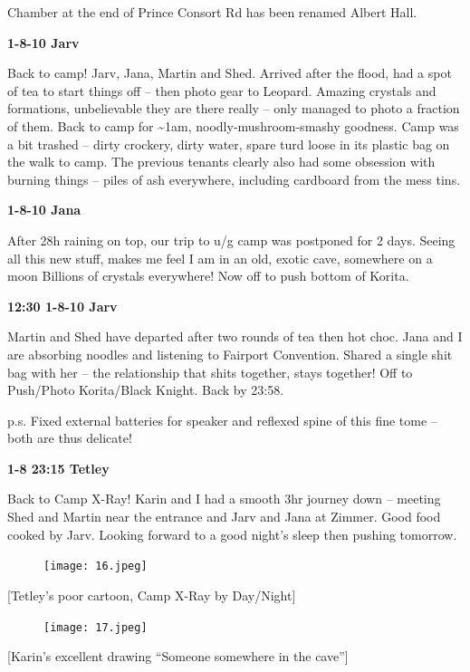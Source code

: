 Chamber at the end of Prince Consort Rd has been renamed Albert Hall.

\textbf{1-8-10 Jarv}

Back to camp! Jarv, Jana, Martin and Shed. Arrived after the flood, had
a spot of tea to start things off -- then photo gear to Leopard. Amazing
crystals and formations, unbelievable they are there really -- only
managed to photo a fraction of them. Back to camp for
\textasciitilde{}1am, noodly-mushroom-smashy goodness. Camp was a bit
trashed -- dirty crockery, dirty water, spare turd loose in its plastic
bag on the walk to camp. The previous tenants clearly also had some
obsession with burning things -- piles of ash everywhere, including
cardboard from the mess tins.

\textbf{1-8-10 Jana}

After 28h raining on top, our trip to u/g camp was postponed for 2 days.
Seeing all this new stuff, makes me feel I am in an old, exotic cave,
somewhere on a moon Billions of crystals everywhere! Now off to push
bottom of Korita.

\textbf{12:30 1-8-10 Jarv}

Martin and Shed have departed after two rounds of tea then hot choc.
Jana and I are absorbing noodles and listening to Fairport Convention.
Shared a single shit bag with her -- the relationship that shits
together, stays together! Off to Push/Photo Korita/Black Knight. Back by
23:58.

p.s. Fixed external batteries for speaker and reflexed spine of this
fine tome -- both are thus delicate!

\textbf{1-8 23:15 Tetley}

Back to Camp X-Ray! Karin and I had a smooth 3hr journey down -- meeting
Shed and Martin near the entrance and Jarv and Jana at Zimmer. Good food
cooked by Jarv. Looking forward to a good night's sleep then pushing
tomorrow.

\begin{figure}[htbp]
\centering
\texttt{[image: 16.jpeg]}
\caption{}
\end{figure}

{[}Tetley's poor cartoon, Camp X-Ray by Day/Night{]}

\begin{figure}[htbp]
\centering
\texttt{[image: 17.jpeg]}
\caption{}
\end{figure}

{[}Karin's excellent drawing ``Someone somewhere in the cave''{]}

